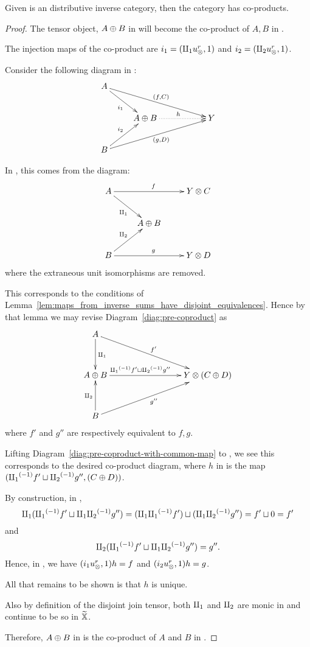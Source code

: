 \begin{proposition}\label{thm:x_tilde_has_coproducts_if_x_is_inverse_distributive_category}
  Given \X is an distributive inverse category, then the category \Xt has co-products.
\end{proposition}
\begin{proof}
  The tensor object, $A\oplus B$ in \X will become the co-product of $A, B$ in \Xt.

  The injection maps of the co-product are $i_1 =(\amalg_{1} u_{\otimes}^r, 1)$ and $i_2 = (\amalg_{2} u_{\otimes}^r, 1)$.

  Consider the following diagram in \Xt:
  \[
    \xymatrix{
      A \ar[drrr]^{(f,C)} \ar[dr]_{i_1} \\
      & A\+B \ar@{.>}[rr]^h & & Y \\
      B \ar[urrr]_{(g,D)} \ar[ur]^{i_2}
    }
  \]

  In \X, this comes from the diagram:
  \begin{equation}
    \xymatrix{
      A \ar[dr]_{\cpa} \ar[rr]^f && Y\*C\\
      & A\+B\\
      B \ar[ur]^{\cpb} \ar[rr]^g && Y\*D\\
    }\label{diag:pre-coproduct}
  \end{equation}
  where the extraneous unit isomorphisms are removed.

  This corresponds to the conditions of
  Lemma~\ref{lem:maps_from_inverse_sums_have_disjoint_equivalences}. Hence by that lemma we may
  revise Diagram~\eqref{diag:pre-coproduct} as
  \begin{equation}
    \xymatrix@R+10pt {
      A \ar[d]^{\cpa} \ar[drrr]^{f'}\\
      A\+B \ar[rrr]^(.4){\icpa f' \djoin \icpb g''} &&& Y\*(C\+D)\\
      B \ar[u]^{\cpb} \ar[urrr]_{g''}\\
    }\label{diag:pre-coproduct-with-common-map}
  \end{equation}
  where $f'$ and $g''$ are respectively equivalent to $f,g$.

  Lifting Diagram~\ref{diag:pre-coproduct-with-common-map} to \X, we see this corresponds to the
  desired co-product diagram, where  $h$ in \Xt is the map $({\amalg_{1}}^{(-1)} f' \sqcup {\amalg_{2}}^{(-1)} g'', (C\oplus D))$.

  By construction, in \X,
  \[
    \amalg_{1} ({\amalg_{1}}^{(-1)} f' \sqcup \amalg_{1}{\amalg_{2}}^{(-1)} g'') = (\amalg_{1}{\amalg_{1}}^{(-1)} f') \sqcup (\amalg_{1}{\amalg_{2}}^{(-1)} g'') = f' \sqcup 0 = f'
  \]
  and
  \[
    \amalg_{2} ({\amalg_{1}}^{(-1)} f' \sqcup \amalg_{1}{\amalg_{2}}^{(-1)} g'') = g''.
  \]
  Hence, in \Xt, we have  $(i_1 u_{\otimes}^r, 1) h = f$ and $(i_2 u_{\otimes}^r, 1) h = g$.

  All that remains to be shown is that $h$ is unique.

  Also by definition of the disjoint join tensor, both $\amalg_{1}$ and $\amalg_{2}$ are monic in \X and
  continue to be so in $\widetilde{\mathbb{X}}$.

  Therefore, $A\oplus B$ in \X is the co-product of $A$ and $B$ in \Xt.
\end{proof}



